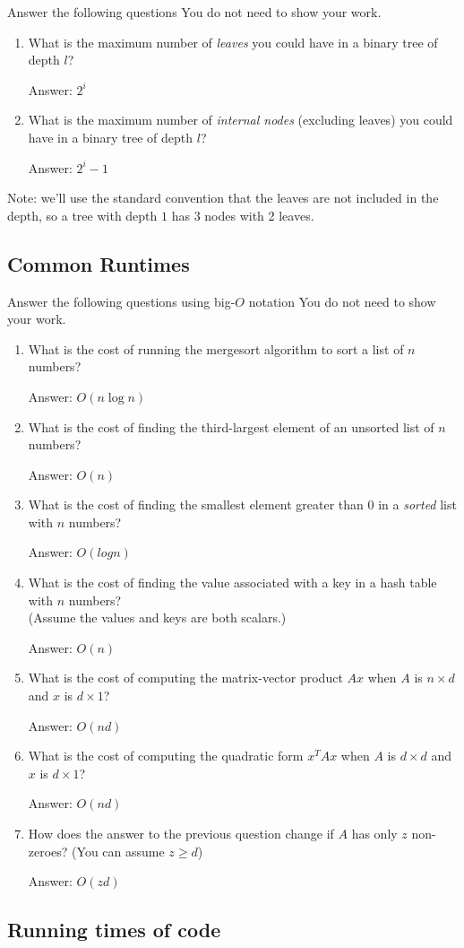 \documentclass{article}
\def\ans#1{\par\gre{Answer: #1}}
\def\blu#1{{\color{blu}#1}}
\def\gre#1{{\color{gre}#1}}
\begin{document}
\blu{Answer the following questions} You do not need to show your work.
\begin{enumerate}
\item What is the maximum number of \emph{leaves} you could have in a binary tree of depth $l$?
\ans{$2^{i}$}
\item What is the maximum number of \emph{internal nodes} (excluding leaves) you could have in a binary tree of depth $l$?
\ans{$2^{i}-1$}
\end{enumerate}
Note: we'll use the standard convention that the leaves are not included in the depth, so a tree with depth $1$ has 3 nodes with 2 leaves.


\subsection{Common Runtimes}

\blu{Answer the following questions using big-$O$ notation} You do not need to show your work.
\begin{enumerate}
\item What is the cost of running the mergesort algorithm to sort  a list of $n$ numbers?
\ans{$O(n\log n)$}
\item What is the cost of finding the third-largest element of an unsorted list of $n$ numbers?
\ans{$O(n)$}
\item What is the cost of finding the smallest element greater than 0 in a \emph{sorted} list with $n$ numbers?
\ans{$O(log n)$}
\item What is the cost of finding the value associated with a key in a hash table with $n$ numbers? \\(Assume the values and keys are both scalars.)
\ans{$O(n)$}
\item What is the cost of computing the matrix-vector product $Ax$ when $A$ is $n \times d$ and $x$ is $d \times 1$?
\ans{$O(nd)$}
\item What is the cost of computing the quadratic form $x^TAx$ when $A$ is $d \times d$ and $x$ is $d \times 1$?
\ans{$O(nd)$}
\item How does the answer to the previous question change if $A$ has only $z$ non-zeroes? (You can assume $z \geq d$)
\ans{$O(zd)$}
\end{enumerate}

\subsection{Running times of code}
\end{document}
